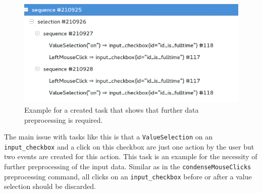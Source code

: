 \begin{figure}[h!]
	\centering
	\includegraphics[scale=0.75]{chapters/casestudy/preprocessing_needed.png}
	\caption{Example for a created task that shows that further data preprocessing is required.}
	\label{fig:preprocessing_needed}
\end{figure}

The main issue with tasks like this is that a \texttt{ValueSelection} on an \texttt{input\_checkbox} and a click on this checkbox are just one action by the user but two events are created for this action.
This task is an example for the necessity of further preprocessing of the input data. 
Similar as in the \texttt{condenseMouseClicks} preprocessing command, all clicks on an \texttt{input\_checkbox} before or after a value selection should be discarded.


